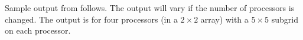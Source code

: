 Sample output from  follows. The output will vary if the
number of processors is changed. The output is for four processors 
(in a $2 \times 2$ array) with a $5 \times 5$ subgrid on each processor.

